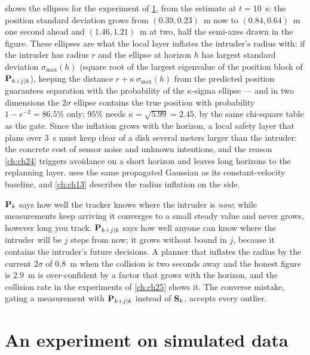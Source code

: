  shows the ellipses for the experiment of
\cref{sec:ch18-experiment}, from the estimate at $t=10$~s: the position
standard deviation grows from $(0.39,0.23)$~m now to $(0.84,0.64)$~m one
second ahead and $(1.46,1.21)$~m at two, half the semi-axes drawn in the
figure. These ellipses are what the local layer inflates the intruder's radius with: if the
intruder has radius $r$ and the ellipse at horizon $h$ has largest standard
deviation $\sigma_{\max}(h)$ (square root of the largest eigenvalue of the
position block of $\mathbf{P}_{k+j\mid k}$), keeping the distance
$r+\kappa\,\sigma_{\max}(h)$ from the predicted position guarantees
separation with the probability of the $\kappa$-sigma ellipse --- and in two
dimensions the $2\sigma$ ellipse contains the true position with probability
$1-e^{-2}=86.5\%$ only; $95\%$ needs $\kappa=\sqrt{5.99}=2.45$, by the same
chi-square table as the gate. Since the inflation grows with the horizon, a
local safety layer that plans over $3$~s must keep clear of a disk several meters
larger than the intruder: the concrete cost of sensor noise and unknown
intentions, and the reason \cref{ch:ch24} triggers avoidance on a short
horizon and leaves long horizons to the replanning layer. 
uses the same propagated Gaussian as its constant-velocity baseline, and
\cref{ch:ch13} describes the radius inflation on the \orca side.

\begin{pitfall}
$\mathbf{P}_k$ says how well the tracker knows where the intruder is
\emph{now}; while measurements keep arriving it converges to a small steady
value and never grows, however long you track. $\mathbf{P}_{k+j\mid k}$ says how well anyone can know where the
intruder will be $j$ steps from now; it grows without bound in $j$, because
it contains the intruder's future decisions. A planner that inflates the
radius by the current $2\sigma$ of $0.8$~m when the collision is two seconds
away and the honest figure is $2.9$~m is over-confident by a factor that
grows with the horizon, and the collision rate in the experiments of
\cref{ch:ch25} shows it. The converse mistake, gating a measurement with
$\mathbf{P}_{k+j\mid k}$ instead of $\mathbf{S}_k$, accepts every outlier.
\end{pitfall}

\section{An experiment on simulated data}
\label{sec:ch18-experiment}

